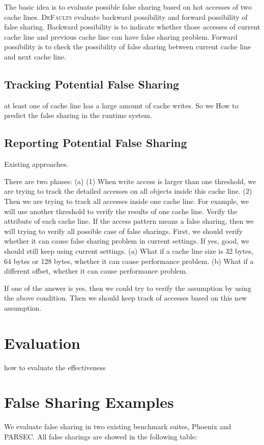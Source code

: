 \documentclass[10pt]{sigplanconf}
\newcommand{\defaults}{{\scshape DeFaults}}
\begin{document}
The basic idea is to evaluate possible false sharing based on hot accesses of two cache lines. 
\defaults{} evaluate backward possibility and forward possibility of false sharing. 
Backward possibility is to indicate whether those accesses of current cache line and previous cache
line can have false sharing problem. Forward possibility is to check the possibility of false sharing
between current cache line and next cache line.  


\subsection{Tracking Potential False Sharing}
\label{sec:tracking}
at least one of cache line has a large amount of cache writes.
So we  
How to predict the false sharing in the runtime system.

\subsection{Reporting Potential False Sharing}
Existing approaches.

There are two phases:
(a) 
(1) When write access is larger than one threshold, we are trying to track the detailed accesses on all objects inside this cache line.
(2) Then we are trying to track all accesses inside one cache line. For example, we will use another threshold to verify the results of 
    one cache line. Verify the attribute of each cache line. If the access pattern means a false sharing, then we will trying to 
    verify all possible case of false sharings.
    First, we should verify whether it can cause false sharing problem in current settings. If yes, good, we should still keep using 
 current settings.  
    (a) What if a cache line size is 32 bytes, 64 bytes or 128 bytes, whether it can cause performance problem. 
    (b) What if a different offset, whether it can cause performance problem. 

    If one of the answer is yes, then we could try to verify the assumption by using the above condition. Then we should keep track of 
accesses based on this new assumption.


%

\section{Evaluation}
how to evaluate the effectiveness
\section{False Sharing Examples}
We evaluate false sharing in two existing benchmark suites, Phoenix and PARSEC. 
All false sharings are showed in the following table:
\end{document}
